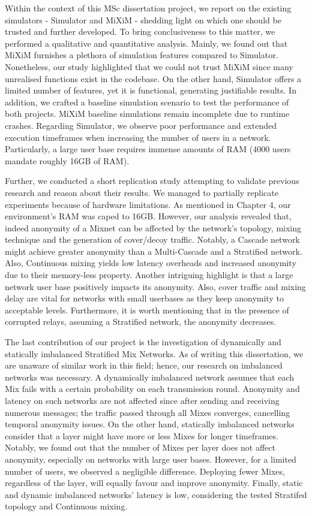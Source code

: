 \documentclass[logo,msc,cyber]{infthesis}   %
\begin{document}
Within the context of this MSc dissertation project, we report on the existing
simulators\cite{simulator,mixim} - Simulator and MiXiM - shedding light on which one should be
trusted and further developed. To bring conclusiveness to this matter, we
performed a qualitative and quantitative analysis. Mainly, we found out that
MiXiM furnishes a plethora of simulation features compared to Simulator.
Nonetheless, our study highlighted that we could not trust MiXiM since many
unrealised functions exist in the codebase. On the other hand, Simulator offers
a limited number of features, yet it is functional, generating justifiable
results. In addition, we crafted a baseline simulation scenario to test the
performance of both projects. MiXiM baseline simulations remain incomplete due
to runtime crashes. Regarding Simulator, we observe poor performance and
extended execution timeframes when increasing the number of users in a network.
Particularly, a large user base requires immense amounts of RAM (4000 users
mandate roughly 16GB of RAM).

Further, we conducted a short replication study attempting to validate previous
research\cite{piotrowska2021studying,ben2021mixim} and reason about their
results. We managed to partially replicate experiments because of hardware
limitations. As mentioned in Chapter 4, our environment's RAM was caped to 16GB.
However, our analysis revealed that, indeed anonymity of a Mixnet can be
affected by the network's topology, mixing technique and the generation of
cover/decoy traffic. Notably, a Cascade network might achieve greater anonymity
than a Multi-Cascade and a Stratified network. Also, Continuous mixing yields low
latency overheads and increased anonymity due to their memory-less property.
Another intriguing highlight is that a large network user base positively
impacts its anonymity. Also, cover traffic and mixing delay are vital for
networks with small userbases as they keep anonymity to acceptable levels.
Furthermore, it is worth mentioning that in the presence of corrupted relays,
assuming a Stratified network, the anonymity decreases. 

The last contribution of our project is the investigation of dynamically and
statically imbalanced Stratified Mix Networks. As of writing this dissertation,
we are unaware of similar work in this field; hence, our research on imbalanced
networks was necessary. A dynamically imbalanced network assumes that each Mix
fails with a certain probability on each transmission round. Anonymity and
latency on such networks are not affected since after sending and receiving
numerous messages; the traffic passed through all Mixes converges, cancelling
temporal anonymity issues. On the other hand, statically imbalanced networks
consider that a layer might have more or less Mixes for longer timeframes.
Notably, we found out that the number of Mixes per layer does not affect
anonymity, especially on networks with large user bases. However, for a limited
number of users, we observed a negligible difference. Deploying fewer Mixes,
regardless of the layer, will equally favour and improve anonymity. Finally,
static and dynamic imbalanced networks' latency is low, considering the tested
Stratifed topology and Continuous mixing.
\end{document}
